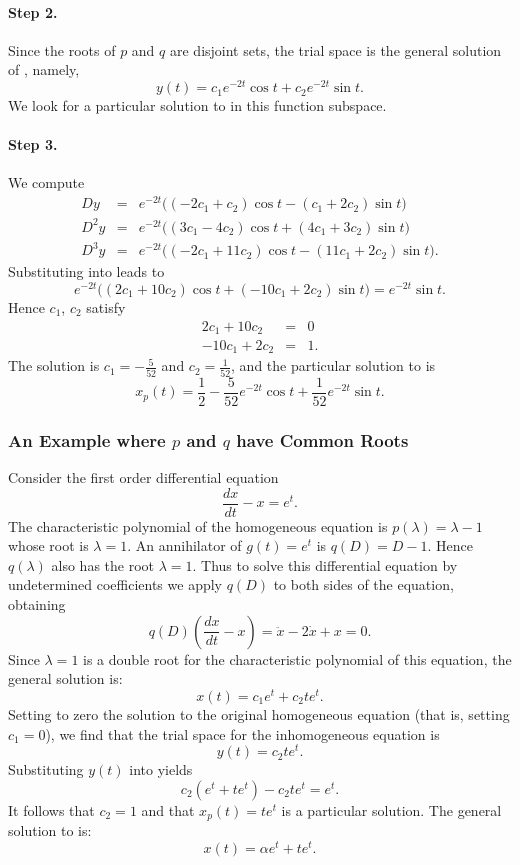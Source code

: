 \documentclass{ximera}
\begin{document}
\paragraph{Step 2.} Since the roots of $p$ and $q$ are disjoint sets, the 
trial space is the general solution of 
, namely,  
\[
y(t) = c_1e^{-2t}\cos t + c_2 e^{-2t}\sin t.
\]
We look for a particular solution to  in this function 
subspace.

\paragraph{Step 3.} We compute
\begin{eqnarray*}
Dy   & = & e^{-2t}\Big((-2c_1+  c_2)\cos t - (  c_1+2c_2)\sin t\Big)\\
D^2y & = & e^{-2t}\Big(( 3c_1- 4c_2)\cos t + ( 4c_1+3c_2)\sin t\Big)\\
D^3y & = & e^{-2t}\Big((-2c_1+11c_2)\cos t - (11c_1+2c_2)\sin t\Big).
\end{eqnarray*}
Substituting into  leads to 
\[
e^{-2t}\Big( (2c_1+10c_2)\cos t +(-10c_1+2c_2)\sin t\Big) = 
e^{-2t}\sin t.
\]
Hence $c_1$, $c_2$ satisfy
\begin{eqnarray*}
  2c_1 +10c_2 & = & 0\\
-10c_1 + 2c_2 & = & 1.
\end{eqnarray*}
The solution is $c_1=-\frac{5}{52}$ and $c_2=\frac{1}{52}$, and
the particular solution to  
is
\[
x_p(t) = \frac{1}{2} - \frac{5}{52}e^{-2t}\cos t + \frac{1}{52}e^{-2t}\sin t.
\]


\subsubsection*{An Example where $p$ and $q$ have Common Roots}

Consider the first order differential equation
\begin{equation}  \label{E:exer4}
\frac{dx}{dt} - x = e^t.
\end{equation}
The characteristic polynomial of the homogeneous equation is 
$p(\lambda)=\lambda-1$ whose root is $\lambda=1$.  An 
annihilator of 
$g(t)=e^t$ is $q(D)=D-1$.  Hence $q(\lambda)$ also has the root $\lambda=1$.
Thus to solve this differential equation by 
undetermined coefficients we
apply $q(D)$ to both sides of the equation, obtaining
\[
q(D) \left(\frac{dx}{dt} - x\right) = \ddot{x} -2\dot{x} +x =0.
\]
Since $\lambda=1$ is a double root for the characteristic polynomial of this 
equation, the general solution is:
\[
x(t) = c_1e^t + c_2te^t.
\]
Setting to zero the solution to the original homogeneous equation (that is, 
setting $c_1=0$), we find that the trial space
for the inhomogeneous equation 
 is
\[
y(t) = c_2te^t.
\] 
Substituting $y(t)$ into  yields
\[
c_2(e^t + te^t) - c_2te^t = e^t.
\] 
It follows that $c_2=1$ and that $x_p(t) = te^t$ is a particular solution. 
The general solution to  is:
\[
x(t) = \alpha e^t + te^t.
\]
\end{document}
